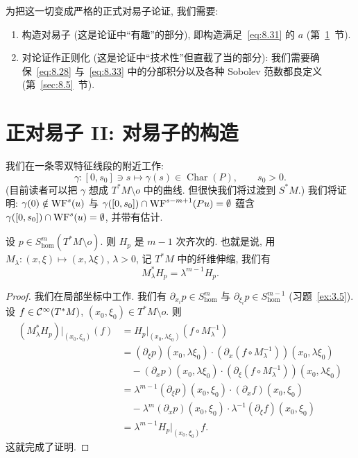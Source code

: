 为把这一切变成严格的正式对易子论证, 我们需要:
\begin{enumerate}
    \item 构造对易子 (这是论证中``有趣''的部分), 即构造满足~\eqref{eq:8.31} 的 $a$ (第~\ref{sec:8.3}~节).
    \item 对论证作正则化 (这是论证中``技术性''但直截了当的部分): 我们需要确保~\eqref{eq:8.28} 与~\eqref{eq:8.33} 中的分部积分以及各种 Sobolev 范数都良定义 (第~\ref{sec:8.5}~节).
\end{enumerate}



\section{正对易子 II: 对易子的构造}\label{sec:8.3}

我们在一条零双特征线段的附近工作:
\begin{equation}\label{eq:8.34}
    \gamma \colon [0, s_0] \ni s \mapsto \gamma(s) \in \operatorname{Char}(P), \qquad s_0 > 0.
\end{equation}
(目前读者可以把 $\gamma$ 想成 $T^*M \setminus o$ 中的曲线. 但很快我们将过渡到 $S^*M$.) 我们将证明: $\gamma(0) \notin \operatorname{WF}^s(u)$ 与 $\gamma([0, s_0]) \cap \operatorname{WF}^{s-m+1}(Pu) = \emptyset$ 蕴含 $\gamma([0, s_0]) \cap \operatorname{WF}^s(u) = \emptyset$, 并带有估计.

\begin{lemma}\label{lem:8.14}
设 $p \in S^m_{\mathrm{hom}}(T^*M \setminus o)$. 则 $H_p$ 是 $m - 1$ 次齐次的. 也就是说, 用 $M_\lambda \colon (x, \xi) \mapsto (x, \lambda\xi)$, $\lambda > 0$, 记 $T^*M$ 中的纤维伸缩, 我们有
\begin{equation}\label{eq:8.35}
    M_\lambda^* H_p = \lambda^{m-1} H_p.
\end{equation}
\end{lemma}

\begin{proof}
我们在局部坐标中工作. 我们有 $\partial_{x_i}p \in S^m_{\mathrm{hom}}$ 与 $\partial_{\xi_i}p \in S^{m-1}_{\mathrm{hom}}$ (习题~\ref{ex:3.5}). 设 $f \in \mathcal{C}^\infty(T^*M)$, $(x_0, \xi_0) \in T^*M \setminus o$. 则
\begin{equation*}
    \begin{aligned}
        (M_\lambda^* H_p)|_{(x_0, \xi_0)}(f) &= H_p|_{(x_0, \lambda\xi_0)}(f \circ M_\lambda^{-1}) \\
        &= (\partial_\xi p)(x_0, \lambda\xi_0) \cdot \left( \partial_x(f \circ M_\lambda^{-1}) \right)(x_0, \lambda\xi_0) \\
        &\quad - (\partial_x p)(x_0, \lambda\xi_0) \cdot \left( \partial_\xi(f \circ M_\lambda^{-1}) \right)(x_0, \lambda\xi_0) \\
        &= \lambda^{m-1}(\partial_\xi p)(x_0, \xi_0) \cdot (\partial_x f)(x_0, \xi_0) \\
        &\quad - \lambda^m (\partial_x p)(x_0, \xi_0) \cdot \lambda^{-1}(\partial_\xi f)(x_0, \xi_0) \\
        &= \lambda^{m-1} H_p|_{(x_0, \xi_0)} f.
    \end{aligned}
\end{equation*}
这就完成了证明.
\end{proof}

